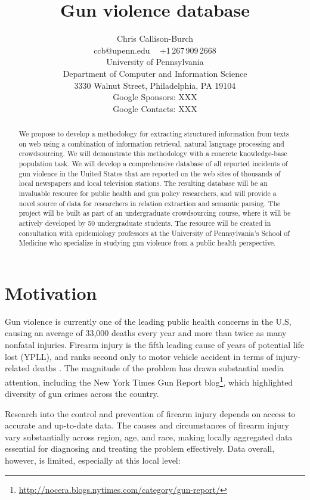 \documentclass[11pt]{article}
\title{Gun violence database}
\author{Chris Callison-Burch \\
 ccb@upenn.edu ~ +1\,267\,909\,2668 \\
 University of Pennsylvania \\
 Department of Computer and Information Science \\
 3330 Walnut Street, Philadelphia, PA 19104 \\
 Google Sponsors: XXX \\
 Google Contacts: XXX}
\date{}
\begin{document}
\maketitle

\begin{abstract}
We propose to develop a methodology for extracting structured information from texts on web using a combination of information retrieval, natural language processing and crowdsourcing.  We will demonstrate this methodology with a concrete knowledge-base population task.  We will develop a comprehensive database of all reported incidents of gun violence in the United States that are reported on the web sites of thousands of local newspapers and local television stations. The resulting database will be an invaluable resource for public health and gun policy researchers, and will provide a novel source of data for researchers in relation extraction and semantic parsing. The project will be built as part of an undergraduate crowdsourcing course, where it will be actively developed by 50 undergraduate students.  The resource will be created in consultation with epidemiology professors at the University of Pennsylvania's School of Medicine who specialize in studying gun violence from a public health perspective. 
\end{abstract}

\section{Motivation}

Gun violence is currently one of the leading public health concerns in the U.S, causing an average of 33,000 deaths every year and more than twice as many nonfatal injuries. Firearm injury is the fifth leading cause of years of potential life lost (YPLL), and ranks second only to motor vehicle accident in terms of injury-related deaths  \cite{ficapresourcebook} . The magnitude of the problem has drawn substantial media attention, including the New York Times Gun Report blog\footnote{\url{http://nocera.blogs.nytimes.com/category/gun-report/}}, which highlighted diversity of gun crimes across the country.

Research into the control and prevention of firearm injury depends on access to accurate and up-to-date data. The causes and circumstances of firearm injury vary substantially across region, age, and race, making locally aggregated data essential for diagnosing and treating the problem effectively. Data overall, however, is limited, especially at this local level:
\end{document}
